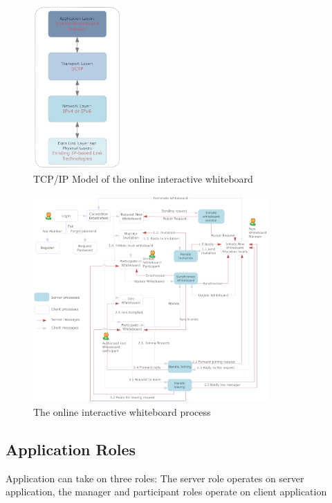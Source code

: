\documentclass[conference]{IEEEtran}
\begin{document}
 \begin{figure}[h]
\begin{center}
\includegraphics[width=0.3\textwidth]{iw_tcpip.png}
\caption{TCP/IP Model of the online interactive whiteboard}
\label{fig:3}
\end{center}
\end{figure}
 \begin{figure}[t]
\begin{center}
\includegraphics[width=0.8\textwidth]{process}
\caption{The online interactive whiteboard process}
\label{fig:4}
\end{center}
\end{figure}

\subsection{Application Roles}
Application can take on three roles: The server role operates on server application, the manager and participant roles operate on client application
\end{document}
